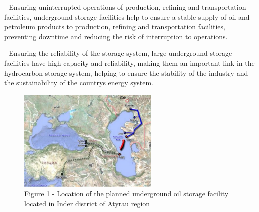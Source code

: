 \begin{multicols}{2}
- Ensuring uninterrupted operations of production, refining and
transportation facilities, underground storage facilities help to ensure
a stable supply of oil and petroleum products to production, refining
and transportation facilities, preventing downtime and reducing the risk
of interruption to operations.

- Ensuring the reliability of the storage system, large underground
storage facilities have high capacity and reliability, making them an
important link in the hydrocarbon storage system, helping to ensure the
stability of the industry and the sustainability of the
country\textquotesingle s energy system.
\end{multicols}

\begin{figure}[H]
	\centering
	\includegraphics[width=0.6\textwidth]{assets/304}
	\caption*{Figure 1 - Location of the planned underground oil storage
facility located in Inder district of Atyrau region}
\end{figure}

